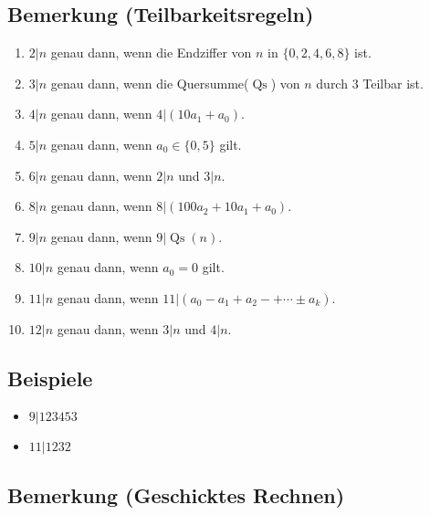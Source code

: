 	
\subsection[Teilbarkeitsregeln]{Bemerkung (Teilbarkeitsregeln)}	

	\begin{enumerate}
	
		\item $2|n$ genau dann, wenn die Endziffer von $n$ in $\{0,2,4,6,8\}$ ist.
		\item $3|n$ genau dann, wenn die Quersumme($\operatorname{Qs}$)
		von $n$ durch 3 Teilbar ist.
		\item $4|n$ genau dann, wenn $4|(10a_1+a_0)$.
		\item $5|n$ genau dann, wenn $a_0\in\{0,5\}$ gilt.
		\item $6|n$ genau dann, wenn $2|n$ und $3|n$.
		\item $8|n$ genau dann, wenn $8|(100a_2+10a_1+a_0)$.
		\item $9|n$ genau dann, wenn $9|\operatorname{Qs}(n)$.
		\item $10|n$ genau dann, wenn $a_0=0$ gilt.
		\item $11|n$ genau dann, wenn $11|(a_0-a_1+a_2-+\cdots\pm a_k)$.
		\item $12|n$ genau dann, wenn $3|n$ und $4|n$.
	
	\end{enumerate}


\subsection{Beispiele}

	 \begin{itemize}
	 
	 	\item $9|123453$
	 	\item $11|1232$
	 
	 \end{itemize}


\subsection[Geschicktes Rechnen]{Bemerkung (Geschicktes Rechnen)}


